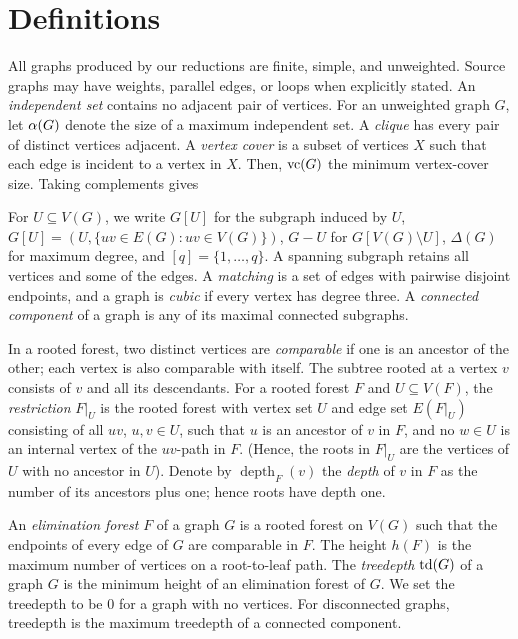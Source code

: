 \section{Definitions}
\label{sec:preliminaries}

All graphs produced by our reductions are finite, simple, and
unweighted. Source graphs may have weights, parallel edges, or loops
when explicitly stated. An \emph{independent set} contains no adjacent
pair of vertices.
For an unweighted graph $G$, let $\alpha(G)$ denote the size of a maximum independent set.
A \emph{clique} has every pair of distinct vertices adjacent.
A \emph{vertex cover} is a subset of vertices $X$ such that each edge is incident to a vertex in $X$.
Then, $\operatorname{vc}(G)$ the minimum vertex-cover size.
Taking complements gives


For $U\subseteq V(G)$, we write $G[U]$ for the subgraph induced by $U$, $G[U]=(U,\{uv\in E(G)\colon uv\in V(G)\})$, $G-U$ for
$G[V(G)\setminus U]$, $\Delta(G)$ for maximum degree, and
$[q]=\{1,\ldots,q\}$. A spanning subgraph retains all vertices
and some of the edges. A \emph{matching} is a set of edges with
pairwise disjoint endpoints, and a graph is \emph{cubic} if every
vertex has degree three.
A \emph{connected component} of a graph is any of its maximal connected subgraphs.

In a rooted forest, two distinct vertices are \emph{comparable} if one is
an ancestor of the other; each vertex is also comparable with itself.
The subtree rooted at a vertex $v$ consists of $v$ and all its descendants.
For a rooted forest $F$ and $U\subseteq V(F)$, the \emph{restriction}
$F|_U$ is the rooted forest with vertex set $U$ and edge set $E(F|_U)$ consisting of all $uv$, $u,v\in U$, such that $u$ is an ancestor of $v$ in $F$, and no $w\in U$ is an internal vertex of the  $uv$-path in $F$.
(Hence, the roots in $F|_U$ are the vertices of $U$ with no ancestor in $U$).
Denote by $\operatorname{depth}_F(v)$ the \emph{depth} of $v$ in $F$ as the number of its ancestors plus one; hence roots have depth one.

An \emph{elimination forest} $F$ of a graph $G$ is a rooted forest on
$V(G)$ such that the endpoints of every edge of $G$ are comparable in $F$.
The height $h(F)$ is the maximum number of vertices on a
root-to-leaf path. The \emph{treedepth} $\operatorname{td}(G)$ of a graph $G$ is the minimum height of
an elimination forest of $G$. We set the treedepth to be $0$ for a graph with no vertices.
For disconnected graphs, treedepth is the maximum treedepth of a connected component.

